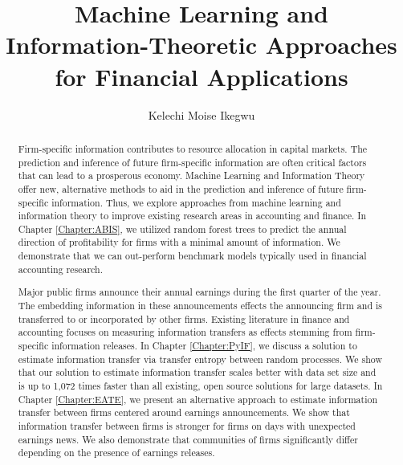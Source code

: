 \documentclass[12pt,edeposit,fullpage]{uiucthesis2014}
\begin{document}
\title{Machine Learning and Information-Theoretic Approaches for Financial Applications}
\author{Kelechi Moise Ikegwu}
\phdthesis
{}
\maketitle

\frontmatter

\begin{abstract}


Firm-specific information contributes to resource allocation in capital markets.  The prediction and inference of future firm-specific information are often critical factors that can lead to a prosperous economy.  Machine Learning and Information Theory offer new, alternative methods to aid in the prediction and inference of future firm-specific information.  Thus, we explore approaches from machine learning and information theory to improve existing research areas in accounting and finance.  
In Chapter \ref{Chapter:ABIS}, we utilized random forest trees to predict the annual direction of profitability for firms with a minimal amount of information.  We demonstrate that we can out-perform benchmark models typically used in financial accounting research.  


Major public firms announce their annual earnings during the first quarter of the year.  The embedding information in these announcements effects the announcing firm and is transferred to or incorporated by other firms.  Existing literature in finance and accounting focuses on measuring information transfers as effects stemming from firm-specific information releases.  In Chapter \ref{Chapter:PyIF}, we discuss a solution to estimate information transfer via transfer entropy between random processes.  We show that our solution to estimate information transfer scales better with data set size and is up to 1,072 times faster than all existing, open source solutions for large datasets.  In Chapter \ref{Chapter:EATE}, we present an alternative approach to estimate information transfer between firms centered around earnings announcements.  We show that information transfer between firms is stronger for firms on days with unexpected earnings news.  We also demonstrate that communities of firms significantly differ depending on the presence of earnings releases. 

\end{abstract}
\end{document}
